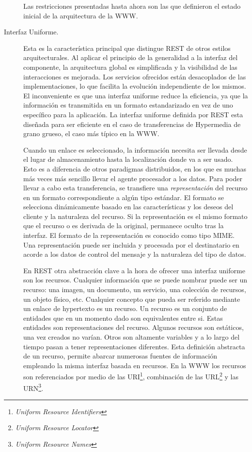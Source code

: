 \begin{description}
  Las restricciones presentadas hasta ahora son las que definieron el
  estado inicial de la arquitectura de la WWW.

\item[Interfaz Uniforme.] Esta es la característica principal que
  distingue REST de otros estilos arquitecturales. Al aplicar el
  principio de la generalidad a la interfaz del componente, la
  arquitectura global es simplificada y la visibilidad de las
  interacciones es mejorada. Los servicios ofrecidos están
  desacoplados de las implementaciones, lo que facilita la evolución
  independiente de los mismos. El inconveniente es que una interfaz
  uniforme reduce la eficiencia, ya que la información es transmitida
  en un formato estandarizado en vez de uno específico para la
  aplicación. La interfaz uniforme definida por REST esta diseñada
  para ser eficiente en el caso de transferencias de Hypermedia de
  grano grueso, el caso más típico en la WWW.

  Cuando un enlace es seleccionado, la información necesita ser
  llevada desde el lugar de almacenamiento hasta la localización donde
  va a ser usado. Esto es a diferencia de otros paradigmas
  distribuidos, en los que es muchas más veces más sencillo llevar el
  agente procesador a los datos. Para poder llevar a cabo esta
  transferencia, se transfiere una \emph{representación} del recurso
  en un formato correspondiente a algún tipo estándar. El formato se
  selecciona dinámicamente basado en las características y los deseos
  del cliente y la naturaleza del recurso. Si la representación es el
  mismo formato que el recurso o es derivada de la original, permanece
  oculto tras la interfaz. El formato de la representación es
  conocido como tipo MIME\cite{MIME}. Una representación puede ser
  incluida y procesada por el destinatario en acorde a los datos de
  control del mensaje y la naturaleza del tipo de datos.

  En REST otra abstracción clave a la hora de ofrecer una interfaz
  uniforme son los recursos. Cualquier información que se puede
  nombrar puede ser un recurso: una imagen, un documento, un servicio,
  una colección de recursos, un objeto físico, etc. Cualquier concepto
  que pueda ser referido mediante un enlace de hypertexto es un
  recurso. Un recurso es un conjunto de entidades que en un momento
  dado son equivalentes entre si. Estas entidades son representaciones
  del recurso. Algunos recursos son estáticos, una vez creados no
  varían. Otros son altamente variables y a lo largo del tiempo pasan
  a tener representaciones diferentes. Esta definición abstracta de un
  recurso, permite abarcar numerosas fuentes de información empleando
  la misma interfaz basada en recursos. En la WWW los recursos son
  referenciados por medio de las URI\footnote{\emph{Uniform Resource
      Identifiers}}, combinación de las URL\footnote{\emph{Uniform
      Resource Locator}} y las URN\footnote{\emph{Uniform Resource
      Names}}.


\end{description}
